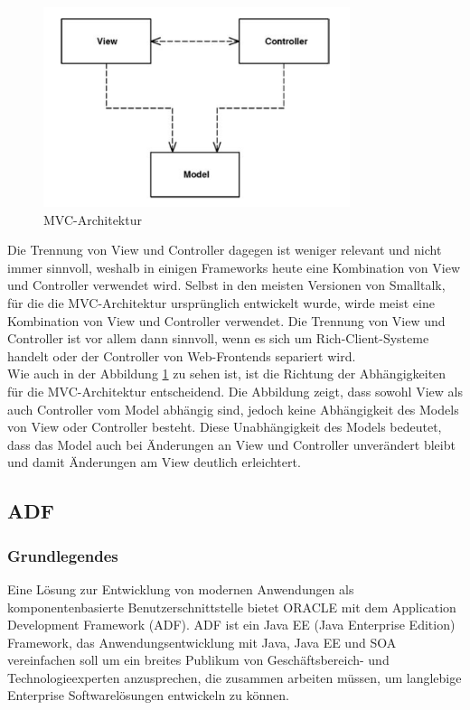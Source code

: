 \begin{figure}[h]
\centering
\includegraphics[width=0.80\textwidth]{img/MVC-Allgemein(Fowler).png}
\caption {MVC-Architektur \autocite[S. 330]{PEAA2002}}
\label{fig:mvc}
\end{figure}
Die Trennung von View und Controller dagegen ist weniger relevant und nicht immer sinnvoll, weshalb in einigen Frameworks heute eine Kombination von View und Controller verwendet wird. Selbst in den meisten Versionen von Smalltalk, für die die MVC-Architektur ursprünglich entwickelt wurde, wirde meist eine Kombination von View und Controller verwendet. Die Trennung von View und Controller ist vor allem dann sinnvoll, wenn es sich um Rich-Client-Systeme handelt oder der Controller von Web-Frontends separiert wird. \autocite[S. 330-332]{PEAA2002}\\
Wie auch in der Abbildung \ref{fig:mvc} zu sehen ist, ist die Richtung der Abhängigkeiten für die MVC-Architektur entscheidend. Die Abbildung zeigt, dass sowohl View als auch Controller vom Model abhängig sind, jedoch keine Abhängigkeit des Models von View oder Controller besteht. Diese Unabhängigkeit des Models bedeutet, dass das Model auch bei Änderungen an View und Controller unverändert bleibt und damit Änderungen am View deutlich erleichtert. \autocite[S. 330-332]{PEAA2002}
\subsection{ADF}
\label{sec:adf}
\subsubsection{Grundlegendes}
Eine Lösung zur Entwicklung von modernen Anwendungen als komponentenbasierte Benutzerschnittstelle bietet ORACLE mit dem Application Development Framework (ADF). ADF ist ein Java EE (Java Enterprise Edition) Framework, das Anwendungsentwicklung mit Java, Java EE und SOA vereinfachen soll um ein breites Publikum von Geschäftsbereich- und Technologieexperten anzusprechen, die zusammen arbeiten müssen, um langlebige Enterprise Softwarelösungen entwickeln zu können\autocite[S. XXIII]{OFDG2010}.

